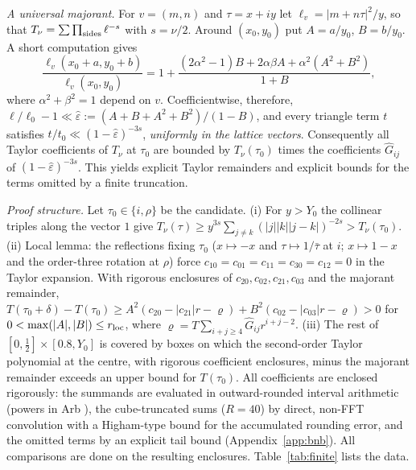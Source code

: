 \documentclass[10pt,twocolumn,a4paper]{article}
\theoremstyle{definition}
\begin{document}
\smallskip\noindent\emph{A universal majorant.} For $v=(m,n)$ and $\tau=x+iy$ let $\ell_v=|m+n\tau|^2/y$, so that $T_\nu=\sum\prod_{\rm sides}\ell^{-s}$ with $s=\nu/2$. Around $(x_0,y_0)$ put $A=a/y_0$, $B=b/y_0$. A short computation gives
\[
\frac{\ell_v(x_0+a,y_0+b)}{\ell_v(x_0,y_0)}=1+\frac{(2\alpha^2-1)B+2\alpha\beta A+\alpha^2(A^2+B^2)}{1+B},
\]
where $\alpha^2+\beta^2=1$ depend on $v$. Coefficientwise, therefore,
$\ell/\ell_0-1\ll\hat\varepsilon:=(A+B+A^2+B^2)/(1-B)$, and every triangle term $t$ satisfies $t/t_0\ll(1-\hat\varepsilon)^{-3s}$, \emph{uniformly in the lattice vectors}. Consequently all Taylor coefficients of $T_\nu$ at $\tau_0$ are bounded by $T_\nu(\tau_0)$ times the coefficients $\hat G_{ij}$ of $(1-\hat\varepsilon)^{-3s}$. This yields explicit Taylor remainders and explicit bounds for the terms omitted by a finite truncation.

\smallskip\noindent\emph{Proof structure.} Let $\tau_0\in\{i,\rho\}$ be the candidate.
(i) For $y>Y_0$ the collinear triples along the vector $1$ give $T_\nu(\tau)\ge y^{3s}\sum_{j\neq k}(|j||k||j-k|)^{-2s}>T_\nu(\tau_0)$.
(ii) Local lemma: the reflections fixing $\tau_0$ ($x\mapsto-x$ and $\tau\mapsto1/\bar\tau$ at $i$; $x\mapsto1-x$ and the order-three rotation at $\rho$) force $c_{10}=c_{01}=c_{11}=c_{30}=c_{12}=0$ in the Taylor expansion. With rigorous enclosures of $c_{20},c_{02},c_{21},c_{03}$ and the majorant remainder, $T(\tau_0+\delta)-T(\tau_0)\ge A^2(c_{20}-|c_{21}|r-\varrho)+B^2(c_{02}-|c_{03}|r-\varrho)>0$ for $0<\max(|A|,|B|)\le r_{\rm loc}$, where $\varrho=T\sum_{i+j\ge4}\hat G_{ij}r^{i+j-2}$.
(iii) The rest of $[0,\frac12]\times[0.8,Y_0]$ is covered by boxes on which the second-order Taylor polynomial at the centre, with rigorous coefficient enclosures, minus the majorant remainder exceeds an upper bound for $T(\tau_0)$.
All coefficients are enclosed rigorously: the summands are evaluated in outward-rounded interval arithmetic (powers in Arb \cite{Arb}), the cube-truncated sums ($R=40$) by direct, non-FFT convolution with a Higham-type bound for the accumulated rounding error, and the omitted terms by an explicit tail bound (Appendix~\ref{app:bnb}). All comparisons are done on the resulting enclosures. Table~\ref{tab:finite} lists the data.
\end{document}
